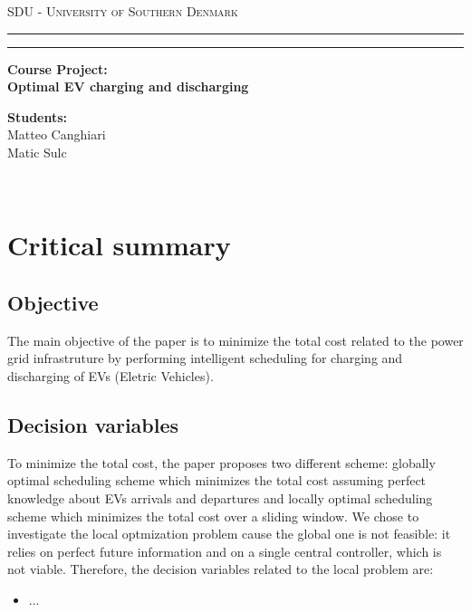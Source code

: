 \documentclass[12pt,a4paper,oneside]{book}
\begin{document}
\pagestyle{empty}
\begin{titlepage}
\begin{center}
    {{\Large{\textsc{SDU - University of Southern Denmark}}}}
    \rule[0.1cm]{\textwidth}{0.1mm}
    \rule[0.5cm]{\textwidth}{0.6mm}
\end{center}

\vspace{45mm}

\begin{center}
    \large \textbf{Course Project: \\ Optimal EV charging and discharging}
\end{center}

\vspace{60mm}
\par
\noindent

\vspace{30mm}

\begin{minipage}[t]{0.8\textwidth}
    {{\textbf{Students:}\\
        Matteo Canghiari \\ Matic Sulc
    }}
\end{minipage}

\end{titlepage}

\restoregeometry

\pagestyle{empty}
\newpage~\newpage
\thispagestyle{empty}

\clearpage
{}
\pagestyle{plain}

\chapter{Critical summary}

\section{Objective}
The main objective of the paper is to minimize the total cost related to the power grid
infrastruture by performing intelligent scheduling for charging and discharging of EVs (Eletric Vehicles).

\section{Decision variables}
To minimize the total cost, the paper proposes two different scheme: globally optimal
scheduling scheme which minimizes the total cost assuming perfect knowledge about EVs
arrivals and departures and locally optimal scheduling scheme which minimizes 
the total cost over a sliding window. We chose to investigate the local optmization 
problem cause the global one is not feasible: it relies on perfect future information and
on a single central controller, which is not viable. Therefore, the decision variables
related to the local problem are:
\begin{itemize}
    \renewcommand{\labelitemi}{-}
    \item ...
\end{itemize}
\end{document}

